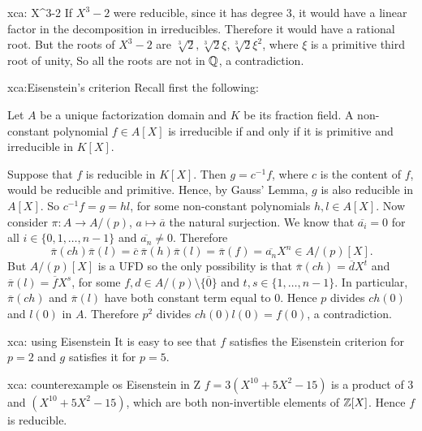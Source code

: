 \begin{sol}{xca: X^3-2}
    If $X^3-2$ were reducible, since it has degree 3,
    it would have a linear
    factor in the decomposition in irreducibles.
    Therefore it would have a rational root.
    But the roots of $X^3-2$ are $\sqrt[3]{2},\sqrt[3]{2}\xi,\sqrt[3]{2}\xi^2$,
    where $\xi$ is a primitive third root of unity,
    So all the roots are not in $\mathbb{Q}$, a contradiction.
\end{sol}

\begin{sol}{xca:Eisenstein's criterion}
Recall first the following:
\begin{lemma}
    Let $A$ be a unique factorization domain and $K$ be its fraction field.
    A non-constant polynomial $f\in A[X]$ is irreducible if and only if it is primitive and irreducible in $K[X]$.
\end{lemma}

    Suppose that $f$ is reducible in $K[X]$.
    Then $g=c^{-1}f$, where $c$ is the content of $f$,
    would be reducible and primitive.
    Hence, by Gauss' Lemma, $g$ is also 
    reducible in $A[X]$.
    So $c^{-1}f=g=hl$, for some non-constant polynomials $h,l\in A[X]$.
    Now consider $\pi:A\to A/(p)$, $a\mapsto \overline{a}$ the natural surjection.
    We know that $\overline{a_i}=0$ for all 
    $i\in\{0,1,\dots, n-1\}$ and $\overline{a_n}\neq 0$.
    Therefore 
    \[
    \overline{\pi}(ch)\overline{\pi}(l)=\overline{c}\:\overline{\pi}(h)\overline{\pi}(l)=\overline{\pi}(f)=\overline{a_n}X^n\in  A/(p)[X].
    \]
    But $A/(p)[X]$ is a UFD so the only possibility
    is that $\overline{\pi}(ch)=\overline{d}X^t$ and $\overline{\pi}(l)=\overline{f}X^s$, for
    some $f,d\in A/(p)\setminus\{\overline{0}\}$
    and $t,s\in\{1,\dots, n-1\}$.
    In particular, $\overline{\pi}(ch)$ and $\overline{\pi}(l)$ have both constant term 
    equal to 0.
    Hence $p$ divides $ch(0)$ and $l(0)$ in $A$.
    Therefore $p^2$ divides $ch(0)l(0)=f(0)$,
    a contradiction.
\end{sol}

\begin{sol}{xca: using Eisenstein}
It is easy to see that $f$ satisfies the Eisenstein criterion for $p=2$
and $g$ satisfies it for $p=5$. 
\end{sol}

\begin{sol}{xca: counterexample os Eisenstein in Z}
    $f=3(X^{10}+5X^2-15)$ is a product of $3$ and $(X^{10}+5X^2-15)$,
    which are both non-invertible elements of $\mathbb{Z}[X]$.
    Hence $f$ is reducible.
\end{sol}

